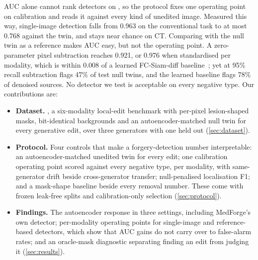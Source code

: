 AUC alone cannot rank detectors on \dataset, so the protocol fixes one operating point on calibration and reads it against every kind of unedited image.
Measured this way, single-image detection falls from 0.963 on the conventional task %
to at most 0.768 against the twin, and stays near chance on CT. %
Comparing with the null twin as a reference makes AUC easy, but not the operating point.
A zero-parameter pixel subtraction reaches 0.921, %
or 0.976 when standardised per modality, %
which is within 0.008 of a learned FC-Siam-diff baseline~\cite{daudt2018fcsiam}; %
yet at 95\% recall subtraction flags 47\% of test null twins, %
and the learned baseline flags 78\% of denoised sources. %
No detector we test is acceptable on every negative type.
Our contributions are:
\begin{itemize}[leftmargin=*,itemsep=1pt,topsep=2pt]
\item \textbf{Dataset.} \dataset, a six-modality local-edit benchmark with per-pixel lesion-shaped masks, bit-identical backgrounds and an autoencoder-matched null twin for every generative edit, over three generators with one held out (\cref{sec:dataset}).
\item \textbf{Protocol.} Four controls that make a forgery-detection number interpretable: an autoencoder-matched unedited twin for every edit; one calibration operating point scored against every negative type, per modality, with same-generator drift beside cross-generator transfer; null-penalised localisation F1; and a mask-shape baseline beside every removal number. These come with frozen leak-free splits and calibration-only selection (\cref{sec:protocol}).
\item \textbf{Findings.} The autoencoder response in three settings, including MedForge's own detector; per-modality operating points for single-image and reference-based detectors, which show that AUC gains do not carry over to false-alarm rates; and an oracle-mask diagnostic separating finding an edit from judging it (\cref{sec:results}).
\end{itemize}
